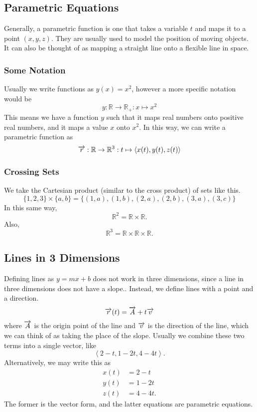 \documentclass[12pt]{article}
\theoremstyle{plain} %
\theoremstyle{definition}
\theoremstyle{definition}
\theoremstyle{definition}
\theoremstyle{remark}
\newcommand{\vecv}{\vv{v}}
\newcommand{\angled}[1]{\left\langle {#1} \right\rangle}
\newcommand*{\vv}[1]{\overrightarrow{\mkern0mu#1}}
\begin{document}
\subsection{Parametric Equations}
Generally, a parametric function is one that takes a variable $t$ and maps it to a point $(x,y,z)$. They are usually used to model the position of moving objects. It can also be thought of as mapping a straight line onto a flexible line in space.

\subsubsection{Some Notation}
Usually we write functions as $y(x) = x^2$, however a more specific notation would be
\[ y:\mathbb{R} \rightarrow \mathbb{R}_+ : x \mapsto x^2 \]
This means we have a function $y$ such that it maps real numbers onto positive real numbers, and it maps a value $x$ onto $x^2$.
In this way, we can write a parametric function as
\[ \vv{r} : \mathbb{R} \rightarrow \mathbb{R}^3 : t \mapsto  \angled{x(t),y(t),z(t)} \]

\subsubsection{Crossing Sets}
We take the Cartesian product (similar to the cross product) of sets like this.
\[ \{1,2,3\}\times\{a,b\} = \{(1,a),(1,b),(2,a),(2,b),(3,a),(3,c)\} \]
In this same way,
\[ \mathbb{R}^2 = \mathbb{R} \times \mathbb{R} .\]
Also,
\[ \mathbb{R}^3 = \mathbb{R} \times \mathbb{R} \times \mathbb{R} .\]

\subsection{Lines in 3 Dimensions}
Defining lines as $y=mx+b$ does not work in three dimensions, since a line in three dimensions does not have a slope.. Instead, we define lines with a point and a direction.
\[ \vv{r}(t) = \vv{A} + t\vecv \]
where $\vv{A}$ is the origin point of the line and $\vecv$ is the direction of the line, which we can think of as taking the place of the slope. Usually we combine these two terms into a single vector, like
\[ \angled{2-t,1-2t,4-4t} .\]
Alternatively, we may write this as
\begin{align*}
    x(t) & = 2-t \\
    y(t) & = 1-2t \\
    z(t) & = 4-4t.
\end{align*}
The former is the vector form, and the latter equations are parametric equations.
\end{document}
